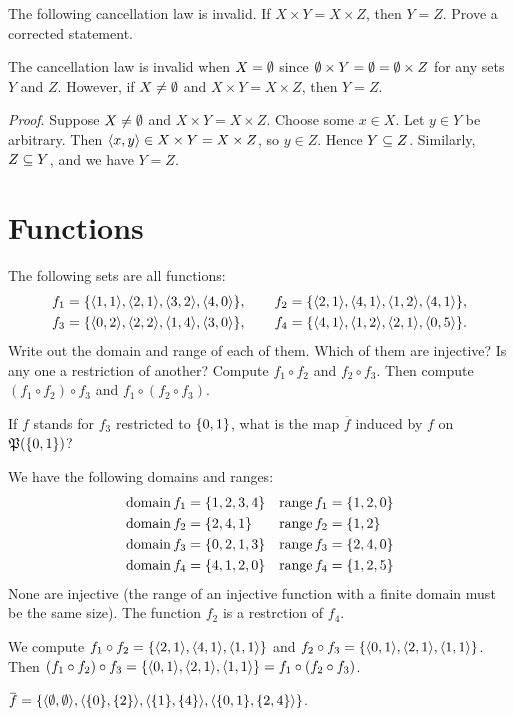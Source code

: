 \begin{exercise}
The following cancellation law is invalid. If $X \times Y = X \times Z$, then $Y = Z$.
Prove a corrected statement.
\end{exercise}

\begin{solution}
The cancellation law is invalid when $X=\emptyset$ since $\emptyset\times Y = \emptyset=\emptyset\times Z$
for any sets $Y$ and $Z$.
However, if $X\neq\emptyset$ and $X \times Y = X \times Z$, then $Y = Z$.

\textit{Proof}. Suppose $X\neq\emptyset$ and $X \times Y = X \times Z$. Choose some $x\in X$.
Let $y\in Y$ be arbitrary. Then $\left\langle x, y\right\rangle\in X \times Y = X \times Z$, so $y\in Z$.
Hence $Y\subseteq Z$. Similarly, $Z\subseteq Y$, and we have $Y=Z$.
\end{solution}


\section{Functions}
\begin{exercise}
The following sets are all functions:
\begin{gather*}
f_1 = \set{\aprn{1,1},\aprn{2,1},\aprn{3,2},\aprn{4,0}},\qquad f_2 = \set{\aprn{2,1},\aprn{4,1},\aprn{1,2},\aprn{4,1}},\\
f_3 = \set{\aprn{0,2},\aprn{2,2},\aprn{1,4},\aprn{3,0}},\qquad f_4 = \set{\aprn{4,1},\aprn{1,2},\aprn{2,1},\aprn{0,5}}.
\end{gather*}
Write out the domain and range of each of them. Which of them are injective? Is any
one a restriction of another? Compute $f_1\circ f_2$ and $f_2\circ f_3$. Then compute
$(f_1\circ f_2)\circ f_3$ and $f_1\circ(f_2\circ f_3)$.

If $f$ stands for $f_3$ restricted to $\left\{0,1\right\}$, what is the map $\overbar f$ induced by $f$
on $\operatorname{\mathfrak{P}}(\left\{0,1\right\})$?
\end{exercise}

\begin{solution}
We have the following domains and ranges:
\begin{align*}
\operatorname{domain} f_1 &= \left\{1, 2, 3, 4\right\} & \operatorname{range} f_1 &= \left\{1,2,0\right\} \\
\operatorname{domain} f_2 &= \left\{2, 4, 1\right\} & \operatorname{range} f_2 &= \left\{1,2\right\} \\
\operatorname{domain} f_3 &= \left\{0, 2, 1, 3\right\} & \operatorname{range} f_3 &= \left\{2,4,0\right\} \\
\operatorname{domain} f_4 &= \left\{4,1,2,0\right\} & \operatorname{range} f_4 &= \left\{1,2,5\right\}
\end{align*}
None are injective (the range of an injective function with a finite domain must be the same size).
The function $f_2$ is a restrction of $f_4$.

We compute $f_1\circ f_2=\set{\aprn{2,1},\aprn{4,1},\aprn{1,1}}$
and $f_2\circ f_3=\set{\aprn{0,1},\aprn{2,1},\aprn{1,1}}$.
Then $(f_1\circ f_2)\circ f_3=\set{\aprn{0,1},\aprn{2,1},\aprn{1,1}}=f_1\circ (f_2\circ f_3)$.

$\overbar f=\set{\aprn{\eset,\eset},\aprn{\set{0},\set{2}},\aprn{\set{1},\set{4}},\aprn{\set{0,1},\set{2,4}}}$.
\end{solution}

